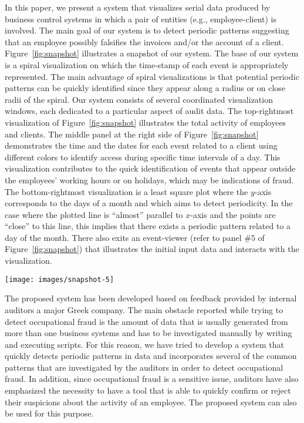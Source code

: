 \documentclass[conference]{IEEEtran}
\begin{document}
In this paper, we present a system that visualizes serial data
produced by business control systems in which a pair of entities
(e.g., employee-client) is involved. The main goal of our system is
to detect periodic patterns suggesting that an employee possibly
falsifies the invoices and/or the account of a client.
Figure~\ref{fig:snapshot} illustrates a snapshot of our system. The
base of our system is a spiral visualization on which the time-stamp
of each event is appropriately represented. The main advantage of
spiral visualizations is that potential periodic patterns can be
quickly identified since they appear along a radius or on close
radii of the spiral. Our system consists of several coordinated
visualization windows, each dedicated to a particular aspect of
audit data. The top-rightmost visualization of
Figure~\ref{fig:snapshot} illustrates the total activity of
employees and clients. The middle panel at the right side of
Figure~\ref{fig:snapshot} demonstrates the time and the dates for
each event related to a client using different colors to identify
access during specific time intervals of a day. This visualization
contributes to the quick identification of events that appear
outside the employees' working hours or on holidays, which may be
indications of fraud. The bottom-rightmost visualization is a least
square plot where the $y$-axis corresponds to the days of a month
and which aims to detect periodicity. In the case where the plotted
line is ``almost'' parallel to $x$-axis and the points are ``close''
to this line, this implies that there exists a periodic pattern
related to a day of the month. There also exits an event-viewer
(refer to panel $\#5$ of Figure~\ref{fig:snapshot}) that illustrates
the initial input data and interacts with the visualization.

\begin{figure*}[h!tb]
  \centering
  \texttt{[image: images/snapshot-5]}
  \caption{A snapshot of the interface of the system. Dates, usernames and actions are made anonymous for confidentiality reasons.}
  \label{fig:snapshot}
\end{figure*}

The proposed system has been developed based on feedback provided by
internal auditors a major Greek company. The main obstacle reported
while trying to detect occupational fraud is the amount of data that
is usually generated from more than one business systems and has to
be investigated manually by writing and executing scripts. For this
reason, we have tried to develop a system that quickly detects
periodic patterns in data and incorporates several of the common
patterns that are investigated by the auditors in order to detect
occupational fraud. In addition, since occupational fraud is a
sensitive issue, auditors have also emphasized the necessity to have
a tool that is able to quickly confirm or reject their suspicions
about the activity of an employee. The proposed system can also be
used for this purpose.
\end{document}
